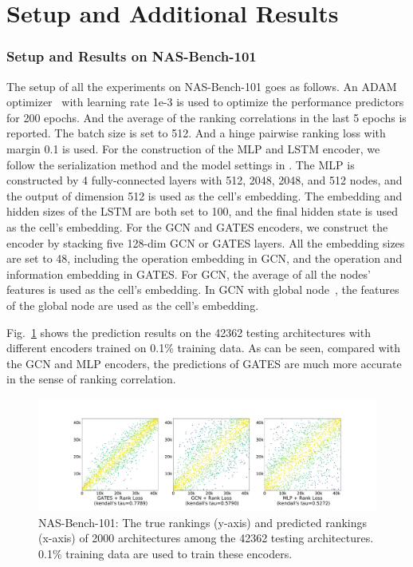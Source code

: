 \section{Setup and Additional Results}

\subsubsection{Setup and Results on NAS-Bench-101}
The setup of all the experiments on NAS-Bench-101 goes as follows. An ADAM optimizer~\cite{kingma2014adam} with learning rate 1e-3 is used to optimize the performance predictors for 200 epochs. And the average of the ranking correlations in the last 5 epochs is reported. The batch size is set to 512. And a hinge pairwise ranking loss with margin 0.1 is used. For the construction of the MLP and LSTM encoder, we follow the serialization method and the model settings in \cite{wang2018alphax}. The MLP is constructed by 4 fully-connected layers with 512, 2048, 2048, and 512 nodes, and the output of dimension 512 is used as the cell's embedding. The embedding and hidden sizes of the LSTM are both set to 100, and the final hidden state is used as the cell's embedding. For the GCN and GATES encoders, we construct the encoder by stacking five 128-dim GCN or GATES layers. 
All the embedding sizes are set to 48, including the operation embedding in GCN, and the operation and information embedding in GATES. For GCN, the average of all the nodes' features is used as the cell's embedding. In GCN with global node~\cite{shi2019multi}, the features of the global node are used as the cell's embedding.

Fig.~\ref{fig:scatter-nb101} shows the prediction results on the 42362 testing architectures with different encoders trained on 0.1\% training data.
As can be seen, compared with the GCN and MLP encoders, the predictions of GATES are much more accurate in the sense of ranking correlation.


\begin{figure}[bt]
\includegraphics[width=1.\linewidth]{figs/nb101_sactter.pdf}
\caption{NAS-Bench-101: The true rankings (y-axis) and predicted rankings (x-axis) of 2000 architectures among the 42362 testing architectures. 0.1\% training data are used to train these encoders.}
\label{fig:scatter-nb101}
\end{figure}

